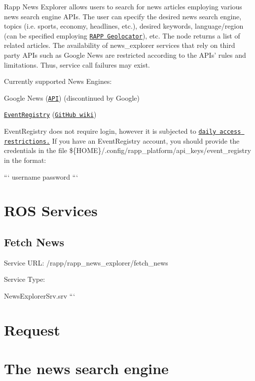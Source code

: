 Rapp News Explorer allows users to search for news articles employing various news search engine A\-P\-Is. The user can specify the desired news search engine, topics (i.\-e. sports, economy, headlines, etc.), desired keywords, language/region (can be specified employing \href{https://github.com/rapp-project/rapp-platform/wiki/RAPP-Geolocator}{\tt R\-A\-P\-P Geolocator}), etc. The node returns a list of related articles. The availability of news\-\_\-explorer services that rely on third party A\-P\-Is such as Google News are restricted according to the A\-P\-Is' rules and limitations. Thus, service call failures may exist.

Currently supported News Engines\-:
\begin{DoxyItemize}
\item Google News (\href{https://developers.google.com/news-search/v1/devguide}{\tt A\-P\-I}) (discontinued by Google)
\item \href{http://eventregistry.org/}{\tt Event\-Registry} (\href{https://github.com/gregorleban/EventRegistry/wiki}{\tt Git\-Hub wiki})
\end{DoxyItemize}

Event\-Registry does not require login, however it is subjected to \href{https://github.com/gregorleban/EventRegistry/wiki/Daily-access-restrictions}{\tt daily access restrictions.} If you have an Event\-Registry account, you should provide the credentials in the file {\ttfamily \$\{H\-O\-M\-E\}/.config/rapp\-\_\-platform/api\-\_\-keys/event\-\_\-registry} in the format\-:

``` username password ```

\section*{R\-O\-S Services}

\subsection*{Fetch News}

Service U\-R\-L\-: {\ttfamily /rapp/rapp\-\_\-news\-\_\-explorer/fetch\-\_\-news}

Service Type\-:

News\-Explorer\-Srv.\-srv ``` \section*{Request}

\section*{The news search engine}

